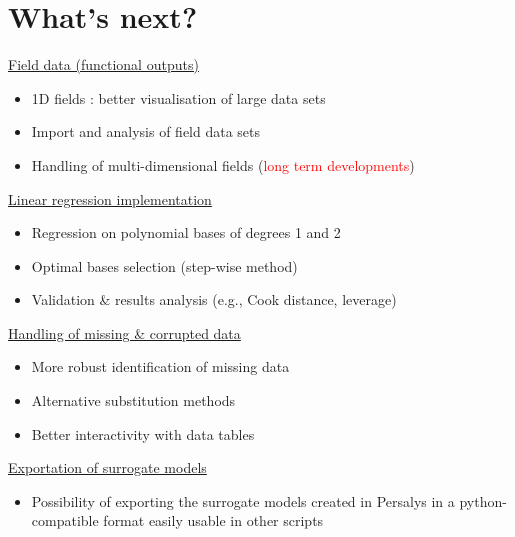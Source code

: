 \documentclass[aspectratio=169]{beamer}
\begin{document}
\section{What's next?}
\begin{frame}
\begin{small}


\begin{minipage}[t]{0.5\textwidth}
\underline{Field data (functional outputs)}
\begin{itemize}
\item 1D fields : better visualisation of large data sets
\item Import and analysis of field data sets
\item Handling of multi-dimensional fields (\textcolor{red}{long term developments})
\end{itemize}

\end{minipage}%
\begin{minipage}[t]{0.5\textwidth}
\underline{Linear regression implementation}
\begin{itemize}
\item Regression on polynomial bases of degrees 1 and 2
\item Optimal bases selection (step-wise method)
\item Validation \& results analysis (e.g., Cook distance, leverage)
\end{itemize}

\end{minipage}%

\vspace{12pt}

\begin{minipage}[t]{0.5\textwidth}
\underline{Handling of missing \& corrupted data}
\begin{itemize}
\item More robust identification of missing data
\item Alternative substitution methods
\item Better interactivity with data tables
\end{itemize}

\end{minipage}%
\begin{minipage}[t]{0.5\textwidth}
\underline{Exportation of surrogate models}
\begin{itemize}
\item Possibility of exporting the surrogate models created in Persalys in a python-compatible format easily usable in other scripts
\end{itemize}

\end{minipage}
\end{small}

\end{frame}
\end{document}
